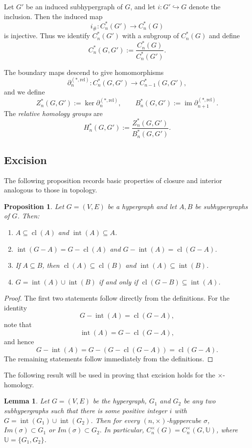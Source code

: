 \documentclass[10pt,a4paper]{amsart}
\newtheorem{prop}[subsection]{Proposition}
\newtheorem{lem}[subsection]{Lemma}
\newcommand{\cl}{\operatorname{cl}}
\renewcommand{\int}{\operatorname{int}}
\begin{document}
\medskip

Let $G'$ be an induced subhypergraph of $G$, and let $i : G' \hookrightarrow G$ denote the inclusion. Then the induced map
\[
i_\#: C_n^*(G') \to C_n^*(G)
\]
is injective. Thus we identify $C_n^*(G')$ with a subgroup of $C_n^*(G)$ and define
\[
C_n^*(G,G') := \frac{C_n^*(G)}{C_n^*(G')}.
\]

The boundary maps descend to give homomorphisms
\[
\partial_n^{(*,\mathrm{rel})} : C_n^*(G,G') \to C_{n-1}^*(G,G'),
\]
and we define
\[
Z_n^*(G,G') := \ker \partial_n^{(*,\mathrm{rel})}, \qquad
B_n^*(G,G') := \operatorname{im} \partial_{n+1}^{(*,\mathrm{rel})}.
\]
The \emph{relative homology groups} are
\[
H_n^*(G,G') := \frac{Z_n^*(G,G')}{B_n^*(G,G')}.
\]

\subsection{Excision}

The following proposition records basic properties of closure and interior analogous to those in topology.

\begin{prop}\label{prop:closure-interior}
Let $G=(V,E)$ be a hypergraph and let $A,B$ be subhypergraphs of $G$. Then:
\begin{enumerate}
    \item $A \subseteq \cl(A)$ and $\int(A) \subseteq A$.
    \item $\int(G - A) = G - \cl(A)$ and $G - \int(A) = \cl(G - A)$.
    \item If $A \subseteq B$, then $\cl(A) \subseteq \cl(B)$ and $\int(A) \subseteq \int(B)$.
    \item $G = \int(A) \cup \int(B)$ if and only if $\cl(G - B) \subseteq \int(A)$.
\end{enumerate}
\end{prop}


\begin{proof}
The first two statements follow directly from the definitions. For the identity
\[
G - \int(A) = \cl(G - A),
\]
note that
\[
\int(A) = G - \cl(G - A),
\]
and hence
\[
G - \int(A) = G - (G - \cl(G - A)) = \cl(G - A).
\]
The remaining statements follow immediately from the definitions.
\end{proof}

\medskip
The following result will be used in proving that excision holds for the $\times$-homology.

\begin{lem}\label{times hom lem}
Let $G=(V,E)$ be the hypergraph, $G_1$ and $G_2$ be any two subhypergraphs such that there is some positive integer $i$ with  $G=\int(G_1)\cup \int(G_2)$. Then for every $(n,\times)$-hyppercube $\sigma$, $Im(\sigma)\subset G_1$ or $Im(\sigma) \subset G_2.$ In particular, $C_n^\times(G)=C_n^\times( G,\mathbb{U})$, where $\mathbb{U}=\{G_1,G_2\}$.
\end{lem}
\end{document}
